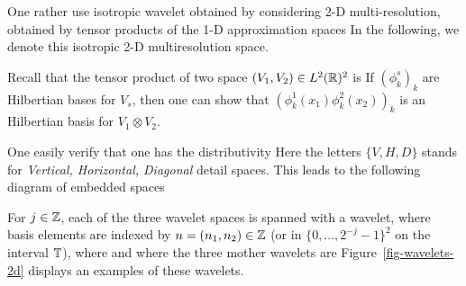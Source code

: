 One rather use isotropic wavelet obtained by considering 2-D multi-resolution, obtained by tensor products of the 1-D approximation spaces
In the following, we denote 
this isotropic 2-D multiresolution space. 

Recall that the tensor product of two space $(V_1,V_2) \in L^2(\mathbb{R})^2$ is
If $(\phi_k^s)_k$ are Hilbertian bases for $V_s$, then one can show that $( \phi_k^1(x_1)\phi_k^2(x_2) )_{k}$ is an Hilbertian basis for $V_1 \otimes V_2$.

One easily verify that one has the distributivity
Here the letters $\{V,H,D\}$ stands for \textit{Vertical, Horizontal, Diagonal} detail spaces. 
%
This leads to the following diagram of embedded spaces
\begin{center}
\end{center}

For $j \in \mathbb{Z}$, each of the three wavelet spaces is spanned with a wavelet, where basis elements are indexed by $n=(n_1,n_2) \in \mathbb{Z}$ (or in $\{0,\ldots,2^{-j}-1\}^2$ on the interval $\mathbb{T}$),
where
and where the three mother wavelets are
Figure~\ref{fig-wavelets-2d} displays an examples of these wavelets.




